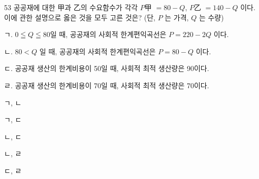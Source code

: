 \begin{question}{53}
공공재에 대한 甲과 乙의 수요함수가 각각 $P$甲 $=80-Q$, $P$乙 $=140-Q$ 이다. 이에 관한 설명으로 옳은 것을 모두 고른 것은? (단, $P$ 는 가격, $Q$ 는 수량)
\begin{framedtext}
ㄱ. $0≦Q≦80$일 때, 공공재의 사회적 한계편익곡선은 $P=220-2Q$ 이다. \par
ㄴ. $80<Q$ 일 때, 공공재의 사회적 한계편익곡선은 $P=80-Q$ 이다. \par
ㄷ. 공공재 생산의 한계비용이 50일 때, 사회적 최적 생산량은 90이다. \par
ㄹ. 공공재 생산의 한계비용이 70일 때, 사회적 최적 생산량은 70이다. \par
\end{framedtext}
\begin{choices}
  \item ㄱ, ㄴ
  \item ㄱ, ㄷ
  \item ㄴ, ㄷ
  \item ㄴ, ㄹ
  \item ㄷ, ㄹ
\end{choices}
\end{question}
